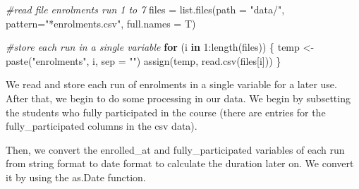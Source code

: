 \documentclass[12pt,]{article}
\newenvironment{Shaded}{\begin{snugshade}}{\end{snugshade}}
\newcommand{\AttributeTok}[1]{\textcolor[rgb]{0.77,0.63,0.00}{#1}}
\newcommand{\CommentTok}[1]{\textcolor[rgb]{0.56,0.35,0.01}{\textit{#1}}}
\newcommand{\ControlFlowTok}[1]{\textcolor[rgb]{0.13,0.29,0.53}{\textbf{#1}}}
\newcommand{\DecValTok}[1]{\textcolor[rgb]{0.00,0.00,0.81}{#1}}
\newcommand{\FunctionTok}[1]{\textcolor[rgb]{0.00,0.00,0.00}{#1}}
\newcommand{\NormalTok}[1]{#1}
\newcommand{\OtherTok}[1]{\textcolor[rgb]{0.56,0.35,0.01}{#1}}
\newcommand{\SpecialCharTok}[1]{\textcolor[rgb]{0.00,0.00,0.00}{#1}}
\newcommand{\StringTok}[1]{\textcolor[rgb]{0.31,0.60,0.02}{#1}}
\begin{document}
\begin{Shaded}
\begin{Highlighting}[]
\CommentTok{\#read file enrolments run 1 to 7}
\NormalTok{files }\OtherTok{=} \FunctionTok{list.files}\NormalTok{(}\AttributeTok{path =} \StringTok{"data/"}\NormalTok{, }
                   \AttributeTok{pattern=}\StringTok{"*enrolments.csv"}\NormalTok{, }\AttributeTok{full.names =}\NormalTok{ T)}

\CommentTok{\#store each run in a single variable}
\ControlFlowTok{for}\NormalTok{ (i }\ControlFlowTok{in} \DecValTok{1}\SpecialCharTok{:}\FunctionTok{length}\NormalTok{(files)) \{}
\NormalTok{  temp }\OtherTok{\textless{}{-}} \FunctionTok{paste}\NormalTok{(}\StringTok{"enrolments"}\NormalTok{, i, }\AttributeTok{sep =} \StringTok{""}\NormalTok{)}
  \FunctionTok{assign}\NormalTok{(temp, }\FunctionTok{read.csv}\NormalTok{(files[i]))}
\NormalTok{\}}
\end{Highlighting}
\end{Shaded}

We read and store each run of enrolments in a single variable for a
later use. After that, we begin to do some processing in our data. We
begin by subsetting the students who fully participated in the course
(there are entries for the fully\_participated columns in the csv data).

\begin{Shaded}
\end{Shaded}

Then, we convert the enrolled\_at and fully\_participated variables of
each run from string format to date format to calculate the duration
later on. We convert it by using the as.Date function.

\begin{Shaded}
\end{Shaded}
\end{document}
